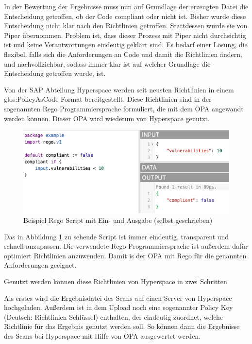 \documentclass[../main.tex]{subfiles}
\begin{document}
In der Bewertung der Ergebnisse muss nun auf Grundlage der erzeugten Datei die Entscheidung getroffen, ob der Code compliant oder nicht ist.
Bisher wurde diese Entscheidung nicht klar nach den Richtlinien getroffen.
Stattdessen wurde sie von Piper übernommen.
Problem ist, dass dieser Prozess mit Piper nicht durchsichtig ist und keine Verantwortungen eindeutig geklärt sind.
Es bedarf einer Lösung, die flexibel, falls sich die Anforderungen an Code und damit die Richtlinien ändern, und nachvollziehbar, sodass immer klar ist auf welcher Grundlage die Entscheidung getroffen wurde, ist.

Von der SAP Abteilung Hyperspace werden seit neusten Richtlinien in einem \gls{glos:PolicyAsCode} Format bereitgestellt.
Diese Richtlinien sind in der sogenannten Rego Programmiersprache formuliert, die mit dem \gls{OPA} angewandt werden können.
Dieser \gls{OPA} wird wiederum von Hyperspace genutzt.

\begin{figure}[ht]
    \centering
    \includegraphics[scale=0.65]{bilder/regoexample.png}
    \caption{Beispiel Rego Script mit Ein- und Ausgabe (selbst geschrieben)}
    \label{fig:regoexample}
\end{figure}

Das in Abbildung \ref{fig:regoexample} zu sehende Script ist immer eindeutig, transparent und schnell anzupassen.
Die verwendete Rego Programmiersprache ist außerdem dafür optimiert Richtlinien anzuwenden.
Damit is der \gls{OPA} mit Rego für die genannten Anforderungen geeignet.
\cite{Rego}

Genutzt werden können diese Richtlinien von Hyperspace in zwei Schritten.

Als erstes wird die Ergebnisdatei des Scans auf einen Server von Hyperspace hochgeladen.
Außerdem ist in dem Upload noch eine sogenannter Policy Key (Deutsch: Richtlinien Schlüssel) enthalten, der eindeutig zuordnet, welche Richtlinie für das Ergebnis genutzt werden soll.
So können dann die Ergebnisse des Scans bei Hyperspace mit Hilfe von \gls{OPA} ausgewertet werden.
\end{document}

